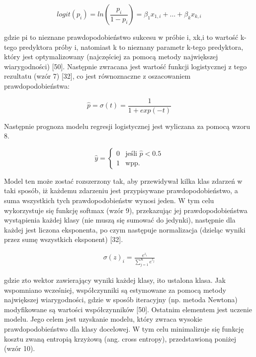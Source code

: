 \begin{equation}
logit(p_{i}) = ln( \frac {p_{i}} {1-p_{i}}) = \beta_{1}x_{1, i}+\dots+\beta_{k}x_{k, i}
\end{equation}

gdzie pi to nieznane prawdopodobieństwo sukcesu w próbie i, xk,i to wartość k-tego predyktora próby i, natomiast k to nieznany parametr k-tego predyktora, który jest optymalizowany (najczęściej za pomocą metody największej wiarygodności) [50]. Następnie zwracana jest wartość funkcji logistycznej z tego rezultatu (wzór 7) [32], co jest równoznaczne z oszacowaniem prawdopodobieństwa: 

\begin{equation}
\hat p = \sigma(t)=\frac {1} {1+exp(-t)}
\end{equation}

Następnie prognoza modelu regresji logistycznej jest wyliczana za pomocą wzoru 8.

\begin{equation}
\hat {y} =
    \begin{cases}
      0 & \text{jeśli $\hat {p} < 0.5$}\\
      1 & \text{wpp.}
 \end{cases}       
\end{equation}

Model ten może zostać rozszerzony tak, aby przewidywał kilka klas zdarzeń w taki sposób, iż każdemu zdarzeniu jest przypisywane prawdopodobieństwo, a suma wszystkich tych prawdopodobieństw wynosi jeden. W tym celu wykorzystuje się funkcję softmax (wzór 9), przekazując jej prawdopodobieństwa wystąpienia każdej klasy (nie muszą się sumować do jedynki), następnie dla każdej jest liczona eksponenta, po czym następuje normalizacja (dzieląc wyniki przez sumę wszystkich eksponent) [32].  

\begin{align*}
\sigma(z)_i=\frac {e^{z_i}} { 
    \sum_{j=1}^{K} e^{z_j}}
\end{align*}

gdzie zto wektor zawierający wyniki każdej klasy, ito ustalona klasa. Jak wspomniano wcześniej, współczynniki są estymowane za pomocą metody największej wiarygodności, gdzie w sposób iteracyjny (np. metoda Newtona) modyfikowane są wartości współczynników [50]. Ostatnim elementem jest uczenie modelu. Jego celem jest uzyskanie modelu, który zwraca wysokie prawdopodobieństwo dla klasy docelowej. W tym celu minimalizuje się funkcję kosztu zwaną entropią krzyżową (ang. cross entropy), przedstawioną poniżej (wzór 10). 

